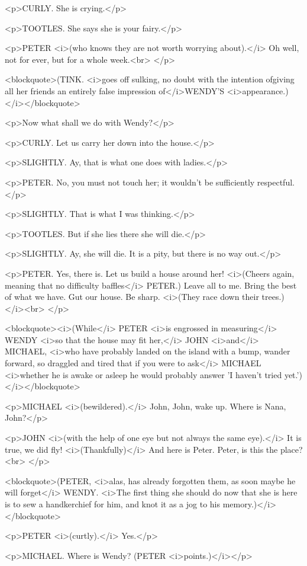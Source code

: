 <p>CURLY. She is crying.</p>

<p>TOOTLES. She says she is your fairy.</p>

<p>PETER <i>(who knows they are not worth worrying about).</i> Oh
well, not for ever, but for a whole week.<br>
</p>

<blockquote>(TINK. <i>goes off sulking, no doubt with the intention
ofgiving all her friends an entirely false impression of</i>WENDY'S
<i>appearance.)</i></blockquote>

<p>Now what shall we do with Wendy?</p>

<p>CURLY. Let us carry her down into the house.</p>

<p>SLIGHTLY. Ay, that is what one does with ladies.</p>

<p>PETER. No, you must not touch her; it wouldn't be sufficiently
respectful.</p>

<p>SLIGHTLY. That is what I was thinking.</p>

<p>TOOTLES. But if she lies there she will die.</p>

<p>SLIGHTLY. Ay, she will die. It is a pity, but there is no way
out.</p>

<p>PETER. Yes, there is. Let us build a house around her! <i>(Cheers
again, meaning that no difficulty baffles</i> PETER.) Leave all to
me. Bring the best of what we have. Gut our house. Be sharp. <i>(They
race down their trees.)</i><br>
</p>

<blockquote><i>(While</i> PETER <i>is engrossed in measuring</i>
WENDY <i>so that the house may fit her,</i> JOHN <i>and</i> MICHAEL,
<i>who have probably landed on the island with a bump, wander
forward, so draggled and tired that if you were to ask</i> MICHAEL
<i>whether he is awake or asleep he would probably answer 'I haven't
tried yet.')</i></blockquote>

<p>MICHAEL <i>(bewildered).</i> John, John, wake up. Where is Nana,
John?</p>

<p>JOHN <i>(with the help of one eye but not always the same
eye).</i> It is true, we did fly! <i>(Thankfully)</i> And here is
Peter. Peter, is this the place?<br>
</p>

<blockquote>(PETER, <i>alas, has already forgotten them, as soon
maybe he will forget</i> WENDY. <i>The first thing she should do now
that she is here is to sew a handkerchief for him, and knot it as a
jog to his memory.)</i></blockquote>

<p>PETER <i>(curtly).</i> Yes.</p>

<p>MICHAEL. Where is Wendy? (PETER <i>points.)</i></p>

